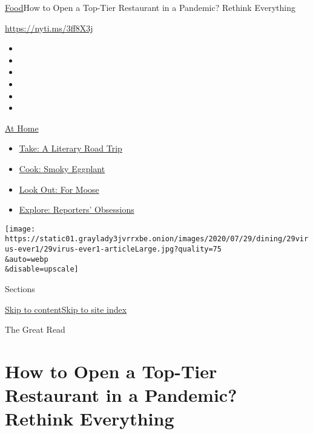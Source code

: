 \href{/section/food}{Food}\textbar{}How to Open a Top-Tier Restaurant in
a Pandemic? Rethink Everything

\url{https://nyti.ms/3ff8X3j}

\begin{itemize}
\item
\item
\item
\item
\item
\item
\end{itemize}

\href{https://www.nytimes3xbfgragh.onion/spotlight/at-home?action=click\&pgtype=Article\&state=default\&region=TOP_BANNER\&context=at_home_menu}{At
Home}

\begin{itemize}
\tightlist
\item
  \href{https://www.nytimes3xbfgragh.onion/2020/07/28/books/time-for-a-literary-road-trip.html?action=click\&pgtype=Article\&state=default\&region=TOP_BANNER\&context=at_home_menu}{Take:
  A Literary Road Trip}
\item
  \href{https://www.nytimes3xbfgragh.onion/2020/07/29/magazine/bored-with-your-home-cooking-some-smoky-eggplant-will-fix-that.html?action=click\&pgtype=Article\&state=default\&region=TOP_BANNER\&context=at_home_menu}{Cook:
  Smoky Eggplant}
\item
  \href{https://www.nytimes3xbfgragh.onion/2020/07/27/travel/moose-michigan-isle-royale.html?action=click\&pgtype=Article\&state=default\&region=TOP_BANNER\&context=at_home_menu}{Look
  Out: For Moose}
\item
  \href{https://www.nytimes3xbfgragh.onion/interactive/2020/at-home/even-more-reporters-editors-diaries-lists-recommendations.html?action=click\&pgtype=Article\&state=default\&region=TOP_BANNER\&context=at_home_menu}{Explore:
  Reporters' Obsessions}
\end{itemize}

\texttt{[image: https://static01.graylady3jvrrxbe.onion/images/2020/07/29/dining/29virus-ever1/29virus-ever1-articleLarge.jpg?quality=75\\\&auto=webp\\\&disable=upscale]}

Sections

\protect\hyperlink{site-content}{Skip to
content}\protect\hyperlink{site-index}{Skip to site index}

The Great Read

\hypertarget{how-to-open-a-top-tier-restaurant-in-a-pandemic-rethink-everything}{%
\section{How to Open a Top-Tier Restaurant in a Pandemic? Rethink
Everything}\label{how-to-open-a-top-tier-restaurant-in-a-pandemic-rethink-everything}}

